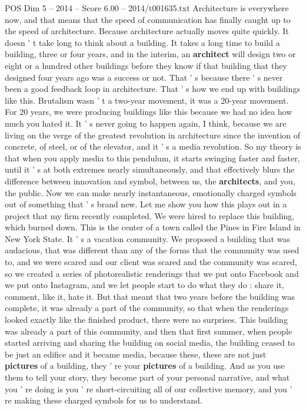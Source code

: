 \begin{textsample}{POS Dim 5 – 2014 – Score 6.00 – 2014/t001635.txt}
Architecture is everywhere now, and that means that the speed of communication has finally caught up to the speed of architecture.
Because architecture actually moves quite quickly.
It doesn ' t take long to think about a building.
It takes a long time to build a building, three or four years, and in the interim, an \textbf{architect} will design two or eight or a hundred other buildings before they know if that building that they designed four years ago was a success or not.
That ' s because there ' s never been a good feedback loop in architecture.
That ' s how we end up with buildings like this.
Brutalism wasn ' t a two-year movement, it was a 20-year movement.
For 20 years, we were producing buildings like this because we had no idea how much you hated it.
It ' s never going to happen again, I think, because we are living on the verge of the greatest revolution in architecture since the invention of concrete, of steel, or of the elevator, and it ' s a media revolution.
So my theory is that when you apply media to this pendulum, it starts swinging faster and faster, until it ' s at both extremes nearly simultaneously, and that effectively blurs the difference between innovation and symbol, between us, the \textbf{architects}, and you, the public.
Now we can make nearly instantaneous, emotionally charged symbols out of something that ' s brand new.
Let me show you how this plays out in a project that my firm recently completed.
We were hired to replace this building, which burned down.
This is the center of a town called the Pines in Fire Island in New York State.
It ' s a vacation community.
We proposed a building that was audacious, that was different than any of the forms that the community was used to, and we were scared and our client was scared and the community was scared, so we created a series of photorealistic renderings that we put onto Facebook and we put onto Instagram, and we let people start to do what they do : share it, comment, like it, hate it.
But that meant that two years before the building was complete, it was already a part of the community, so that when the renderings looked exactly like the finished product, there were no surprises.
This building was already a part of this community, and then that first summer, when people started arriving and sharing the building on social media, the building ceased to be just an edifice and it became media, because these, these are not just \textbf{pictures} of a building, they ' re your \textbf{pictures} of a building.
And as you use them to tell your story, they become part of your personal narrative, and what you ' re doing is you ' re short-circuiting all of our collective memory, and you ' re making these charged symbols for us to understand.

\end{textsample}
